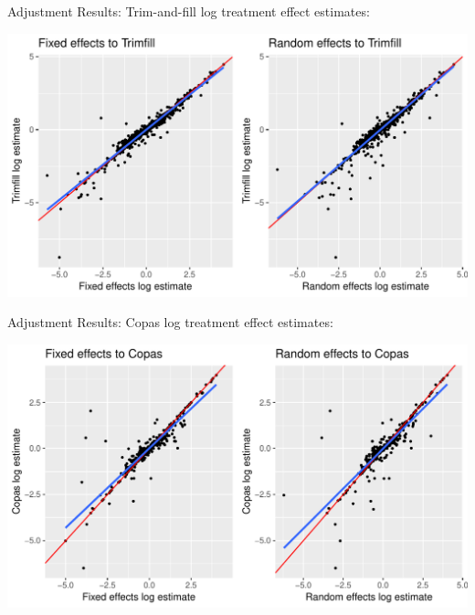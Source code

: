 \documentclass[english]{beamer}\usepackage[]{graphicx}\usepackage[]{color}
\makeatletter
\def\maxwidth{ %
  \ifdim\Gin@nat@width>\linewidth
    \linewidth
  \else
    \Gin@nat@width
  \fi
}
\newenvironment{knitrout}{}{} %
\makeatother
\begin{document}
\begin{frame}[fragile]{Adjustment Results: Trim-and-fill}
log treatment effect estimates:

\vspace{-3mm}
\begin{knitrout}
\color{fgcolor}
\includegraphics[width=\maxwidth]{figure/unnamed-chunk-27-1} 

\end{knitrout}
\end{frame}


\begin{frame}[fragile]{Adjustment Results: Copas}
log treatment effect estimates:

\vspace{-3mm}
\begin{knitrout}
\color{fgcolor}
\includegraphics[width=\maxwidth]{figure/unnamed-chunk-28-1} 

\end{knitrout}
\end{frame}
\end{document}
